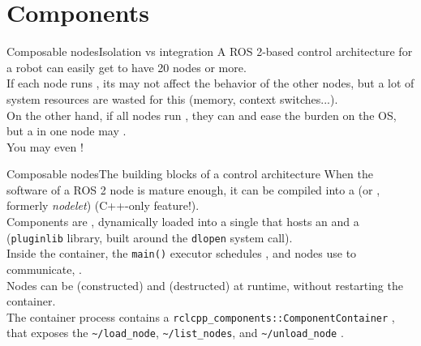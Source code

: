
\section{Components}

\begin{frame}{Composable nodes}{Isolation vs integration}
  \justifying
  A ROS 2-based control architecture for a robot can easily get to have 20 nodes or more.\\
  \bigskip
  If each node runs , its  may not affect the behavior of the other nodes, but a lot of system resources are wasted for this (memory, context switches...).\\
  \bigskip
  On the other hand, if all nodes run , they can  and ease the burden on the OS, but a  in one node may .\\
  \bigskip
  You may even !
\end{frame}
\begin{frame}{Composable nodes}{The building blocks of a control architecture}
  \justifying
  When the software of a ROS 2 node is mature enough, it can be compiled into a  (or , formerly \emph{nodelet}) (C++-only feature!).\\
  \bigskip
  Components are , dynamically loaded into a single  that hosts an  and a  (\texttt{pluginlib} library, built around the \texttt{dlopen} system call).\\
  \bigskip
  Inside the container, the \texttt{main()} executor schedules , and nodes use  to communicate, .\\
  \bigskip
  Nodes can be  (constructed) and  (destructed) at runtime, without restarting the container.\\
  \bigskip
  The container process contains a \texttt{rclcpp\_components::ComponentContainer} , that exposes the \texttt{\textasciitilde/load\_node}, \texttt{\textasciitilde/list\_nodes}, and \texttt{\textasciitilde/unload\_node} .
\end{frame}
